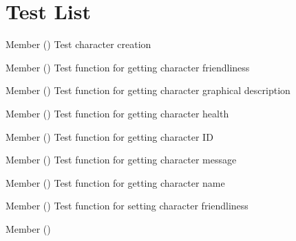 \chapter{Test List}
\hypertarget{test}{}\label{test}

\begin{DoxyRefList}
\item[Member \doxylink{character__test_8h_a2241f1b02a851ed9d52312fb311353b7}{test1\+\_\+character\+\_\+create} ()]\label{test__test000001}%
%
Test character creation  
\item[Member \doxylink{character__test_8h_aa3b5f4115ecc697d865cabc7afd6ba28}{test1\+\_\+character\+\_\+get\+\_\+friendly} ()]\label{test__test000013}%
%
Test function for getting character friendliness  
\item[Member \doxylink{character__test_8h_a230ffbd7927f16f63e80f0dbc781947f}{test1\+\_\+character\+\_\+get\+\_\+gdesc} ()]\label{test__test000007}%
%
Test function for getting character graphical description  
\item[Member \doxylink{character__test_8h_af2a24f3a83deae35d9e2f32b5cf08ed4}{test1\+\_\+character\+\_\+get\+\_\+health} ()]\label{test__test000011}%
%
Test function for getting character health  
\item[Member \doxylink{character__test_8h_a050aa06e22892176bcb01b13879a302c}{test1\+\_\+character\+\_\+get\+\_\+id} ()]\label{test__test000003}%
%
Test function for getting character ID  
\item[Member \doxylink{character__test_8h_a9f1dfd0daea14e2ced5915b529c45df4}{test1\+\_\+character\+\_\+get\+\_\+message} ()]\label{test__test000009}%
%
Test function for getting character message  
\item[Member \doxylink{character__test_8h_a924318e8acfd9a7e5517bae6e80c11aa}{test1\+\_\+character\+\_\+get\+\_\+name} ()]\label{test__test000005}%
%
Test function for getting character name  
\item[Member \doxylink{character__test_8h_a9e96e9415d9016b9d04d3a8e910aeae9}{test1\+\_\+character\+\_\+set\+\_\+friendly} ()]\label{test__test000026}%
%
Test function for setting character friendliness  
\item[Member \doxylink{character__test_8h_a9a2691a0150b1aac87381fbe6d672616}{test1\+\_\+character\+\_\+set\+\_\+gdesc} ()]\label{test__test000020}%

\end{DoxyRefList}
